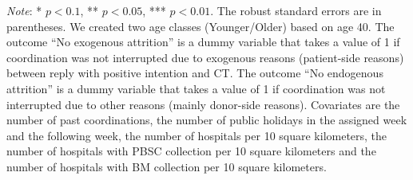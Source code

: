 \documentclass[12pt, a4paper]{article}
\begin{document}
\begin{table}[H]
\begin{threeparttable}
\begin{tablenotes}
\item \emph{Note}: * $p < 0.1$, ** $p < 0.05$, *** $p < 0.01$. The robust standard errors are in parentheses. We created two age classes (Younger/Older) based on age 40. The outcome ``No exogenous attrition'' is a dummy variable that takes a value of 1 if coordination was not interrupted due to exogenous reasons (patient-side reasons) between reply with positive intention and CT. The outcome ``No endogenous attrition'' is a dummy variable that takes a value of 1 if coordination was not interrupted due to other reasons (mainly donor-side reasons). Covariates are the number of past coordinations, the number of public holidays in the assigned week and the following week, the number of hospitals per 10 square kilometers, the number of hospitals with PBSC collection per 10 square kilometers and the number of hospitals with BM collection per 10 square kilometers.
\end{tablenotes}
\end{threeparttable}
\end{table}
\end{document}
